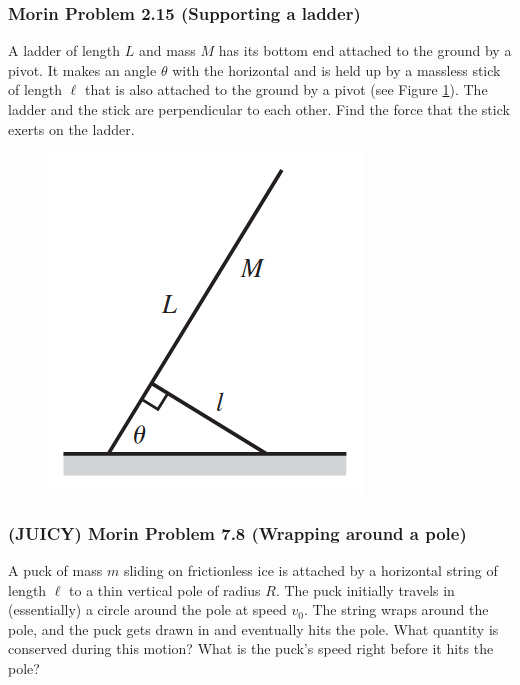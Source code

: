 \documentclass{article}
\begin{document}
\subsubsection{Morin Problem 2.15 (Supporting a ladder)}
A ladder of length $L$ and mass $M$ has its bottom end attached to the ground by a pivot. It makes an angle $\theta$ with the horizontal and is held up by a massless stick of length $\ell$ that is also attached to the ground by a pivot (see Figure \ref{fig:morin2.15}). The ladder and the stick are perpendicular to each other. Find the force that the stick exerts on the ladder.\\
{
\begin{figure} 
\includegraphics[width=\linewidth]{images/morin2.15.png}
\label{fig:morin2.15}
\end{figure}
}
\clearpage
\subsubsection{(JUICY) Morin Problem 7.8 (Wrapping around a pole)}
A puck of mass $m$ sliding on frictionless ice is attached by a horizontal string of length $\ell$ to a thin vertical pole of radius $R$. The puck initially travels in (essentially) a circle around the pole at speed $v_0$. The string wraps around the pole, and the puck gets drawn in and eventually hits the pole. What quantity is conserved during this motion? What is the puck's speed right before it hits the pole?\\[5pt]
\end{document}
